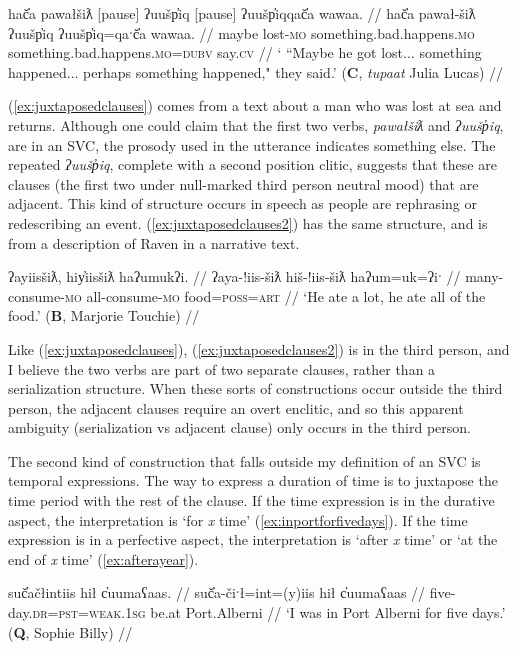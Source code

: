 \ex \label{ex:juxtaposedclauses}
\begingl
\glpreamble hač̓a pawałšiƛ [pause] ʔuušp̓iq [pause] ʔuušp̓iqqač̓a wawaa. //
\gla hač̓a pawał-šiƛ ʔuušp̓iq ʔuušp̓iq=qaˑč̓a wawaa. //
\glb maybe lost-\textsc{mo} something.bad.happens.\textsc{mo} something.bad.happens.\textsc{mo}=\textsc{dubv} say.\textsc{cv} //
\glft ` ``Maybe he got lost... something happened... perhaps something happened," they said.' (\textbf{C}, \textit{tupaat} Julia Lucas) //
\endgl
\xe

(\ref{ex:juxtaposedclauses}) comes from a text about a man who was lost at sea and returns. Although one could claim that the first two verbs, \textit{pawałšiƛ} and \textit{ʔuušp̓iq}, are in an SVC, the prosody used in the utterance indicates something else. The repeated \textit{ʔuušp̓iq}, complete with a second position clitic, suggests that these are clauses (the first two under null-marked third person neutral mood) that are adjacent. This kind of structure occurs in speech as people are rephrasing or redescribing an event. (\ref{ex:juxtaposedclauses2}) has the same structure, and is from a description of Raven in a narrative text.

\ex \label{ex:juxtaposedclauses2}
\begingl
\glpreamble ʔayiisšiƛ, hiy̓iisšiƛ haʔumukʔi. //
\gla ʔaya-!iis-šiƛ hiš-!iis-šiƛ haʔum=uk=ʔiˑ //
\glb many-consume-\textsc{mo} all-consume-\textsc{mo} food=\textsc{poss}=\textsc{art} //
\glft `He ate a lot, he ate all of the food.' (\textbf{B}, Marjorie Touchie) //
\endgl
\xe

Like (\ref{ex:juxtaposedclauses}), (\ref{ex:juxtaposedclauses2}) is in the third person, and I believe the two verbs are part of two separate clauses, rather than a serialization structure. When these sorts of constructions occur outside the third person, the adjacent clauses require an overt enclitic, and so this apparent ambiguity (serialization vs adjacent clause) only occurs in the third person.

The second kind of construction that falls outside my definition of an SVC is temporal expressions. The way to express a duration of time is to juxtapose the time period with the rest of the clause. If the time expression is in the durative aspect, the interpretation is `for \textit{x} time' (\ref{ex:inportforfivedays}). If the time expression is in a perfective aspect, the interpretation is `after \textit{x} time' or `at the end of \textit{x} time' (\ref{ex:afterayear}).

\ex \label{ex:inportforfivedays}
\begingl
\glpreamble suč̓ačłintiis hił c̓uumaʕaas. //
\gla suč̓a-čiˑł=int=(y)iis hił c̓uumaʕaas //
\glb five-day.\textsc{dr}=\textsc{pst}=\textsc{weak.1sg} be.at Port.Alberni //
\glft `I was in Port Alberni for five days.' (\textbf{Q}, Sophie Billy) //
\endgl
\xe

